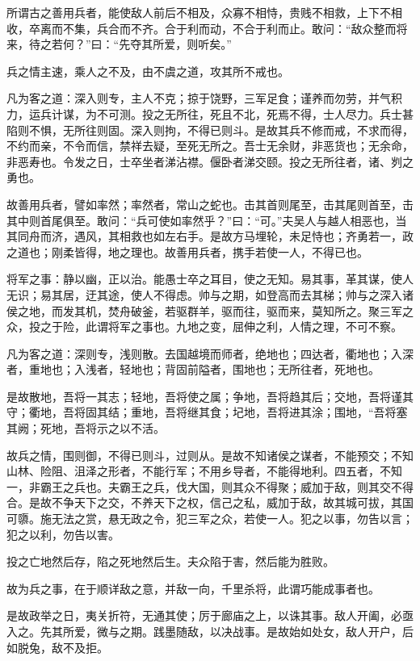 \documentclass[UTF8]{ctexart}
\begin{document}
	所谓古之善用兵者，能使敌人前后不相及，众寡不相恃，贵贱不相救，上下不相收，卒离而不集，兵合而不齐。合于利而动，不合于利而止。敢问：“敌众整而将来，待之若何？”曰：“先夺其所爱，则听矣。”
	
	兵之情主速，乘人之不及，由不虞之道，攻其所不戒也。
	
	凡为客之道：深入则专，主人不克；掠于饶野，三军足食；谨养而勿劳，并气积力，运兵计谋，为不可测。投之无所往，死且不北，死焉不得，士人尽力。兵士甚陷则不惧，无所往则固。深入则拘，不得已则斗。是故其兵不修而戒，不求而得，不约而亲，不令而信，禁祥去疑，至死无所之。吾士无余财，非恶货也；无余命，非恶寿也。令发之日，士卒坐者涕沾襟。偃卧者涕交颐。投之无所往者，诸、刿之勇也。
	
	故善用兵者，譬如率然；率然者，常山之蛇也。击其首则尾至，击其尾则首至，击其中则首尾俱至。敢问：“兵可使如率然乎？”曰：“可。”夫吴人与越人相恶也，当其同舟而济，遇风，其相救也如左右手。是故方马埋轮，未足恃也；齐勇若一，政之道也；刚柔皆得，地之理也。故善用兵者，携手若使一人，不得已也。
	
	将军之事：静以幽，正以治。能愚士卒之耳目，使之无知。易其事，革其谋，使人无识；易其居，迂其途，使人不得虑。帅与之期，如登高而去其梯；帅与之深入诸侯之地，而发其机，焚舟破釜，若驱群羊，驱而往，驱而来，莫知所之。聚三军之众，投之于险，此谓将军之事也。九地之变，屈伸之利，人情之理，不可不察。
	
	凡为客之道：深则专，浅则散。去国越境而师者，绝地也；四达者，衢地也；入深者，重地也；入浅者，轻地也；背固前隘者，围地也；无所往者，死地也。
	
	是故散地，吾将一其志；轻地，吾将使之属；争地，吾将趋其后；交地，吾将谨其守；衢地，吾将固其结；重地，吾将继其食；圮地，吾将进其涂；围地，“吾将塞其阙；死地，吾将示之以不活。
	
	故兵之情，围则御，不得已则斗，过则从。是故不知诸侯之谋者，不能预交；不知山林、险阻、沮泽之形者，不能行军；不用乡导者，不能得地利。四五者，不知一，非霸王之兵也。夫霸王之兵，伐大国，则其众不得聚；威加于敌，则其交不得合。是故不争天下之交，不养天下之权，信己之私，威加于敌，故其城可拔，其国可隳。施无法之赏，悬无政之令，犯三军之众，若使一人。犯之以事，勿告以言；犯之以利，勿告以害。
	
	投之亡地然后存，陷之死地然后生。夫众陷于害，然后能为胜败。
	
	故为兵之事，在于顺详敌之意，并敌一向，千里杀将，此谓巧能成事者也。
	
	是故政举之日，夷关折符，无通其使；厉于廊庙之上，以诛其事。敌人开阖，必亟入之。先其所爱，微与之期。践墨随敌，以决战事。是故始如处女，敌人开户，后如脱兔，敌不及拒。
	
\end{document}
